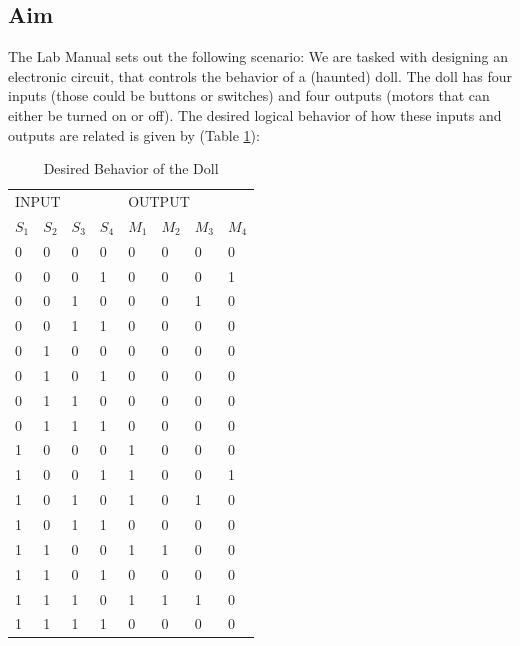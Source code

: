 \documentclass[14pt]{article}
\begin{document}
\subsection{Aim}

The Lab Manual\autocite{ross} sets out the following scenario: We are tasked with designing an electronic circuit, that controls the behavior of a (haunted) doll.
The doll has four inputs (those could be buttons or switches) and four outputs (motors that can either be turned on or off). The desired logical
behavior of how these inputs and outputs are related is given by (Table \ref{table:desired-behaviour}):


\begin{table}[H]
  \centering
  \begin{tabular}{llll|llll}
  \multicolumn{4}{l}{INPUT} & \multicolumn{4}{l}{OUTPUT} \\
  $S_1$ & $S_2$ & $S_3$ & $S_4$ & $M_1$ & $M_2$ & $M_3$ & $M_4$ \\
  \hline
  0    & 0    & 0    & 0    & 0     & 0    & 0    & 0    \\
  0    & 0    & 0    & 1    & 0     & 0    & 0    & 1    \\
  0    & 0    & 1    & 0    & 0     & 0    & 1    & 0    \\
  0    & 0    & 1    & 1    & 0     & 0    & 0    & 0    \\
  0    & 1    & 0    & 0    & 0     & 0    & 0    & 0    \\
  0    & 1    & 0    & 1    & 0     & 0    & 0    & 0    \\
  0    & 1    & 1    & 0    & 0     & 0    & 0    & 0    \\
  0    & 1    & 1    & 1    & 0     & 0    & 0    & 0    \\
  1    & 0    & 0    & 0    & 1     & 0    & 0    & 0    \\
  1    & 0    & 0    & 1    & 1     & 0    & 0    & 1    \\
  1    & 0    & 1    & 0    & 1     & 0    & 1    & 0    \\
  1    & 0    & 1    & 1    & 0     & 0    & 0    & 0    \\
  1    & 1    & 0    & 0    & 1     & 1    & 0    & 0    \\
  1    & 1    & 0    & 1    & 0     & 0    & 0    & 0    \\
  1    & 1    & 1    & 0    & 1     & 1    & 1    & 0    \\
  1    & 1    & 1    & 1    & 0     & 0    & 0    & 0   
  \end{tabular}
  \caption{\label{table:desired-behaviour} Desired Behavior of the Doll \autocite{ross}}
\end{table}
\end{document}
